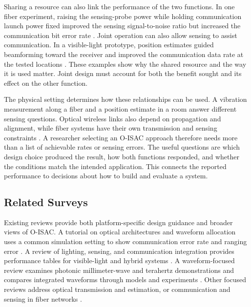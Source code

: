 Sharing a resource can also link the performance of the two functions.
In one fiber experiment, raising the sensing-probe power while holding
communication launch power fixed improved the sensing signal-to-noise ratio
but increased the communication bit error rate \cite{OISAC_SCR00057}.
Joint operation can also allow sensing to assist communication. In a
visible-light prototype, position estimates guided beamforming toward the
receiver and improved the communication data rate at the tested locations
\cite{OISAC_SCR00196}. These examples show why the shared resource and the way
it is used matter. Joint design must account for both the benefit sought and
its effect on the other function.

The physical setting determines how these relationships can be used.
A vibration measurement along a fiber and a position estimate in a room
answer different sensing questions. Optical wireless links also depend on
propagation and alignment, while fiber systems have their own transmission
and sensing constraints \cite{OISAC_SCR00916,OISAC_SCR01085,Mohsan2026OISACReview}.
A researcher selecting an O-ISAC approach therefore needs more than a list
of achievable rates or sensing errors. The useful questions are which design
choice produced the result, how both functions responded, and whether the
conditions match the intended application. This connects the reported
performance to decisions about how to build and evaluate a system.

\subsection{Related Surveys}
\label{sec:related_surveys}

Existing reviews provide both platform-specific design guidance and broader
views of O-ISAC. A tutorial on optical architectures and waveform allocation
uses a common simulation setting to show communication error rate and ranging
error \cite{Wen2024OISACArchitectures}. A review of lighting, sensing, and
communication integration provides performance tables for visible-light and
hybrid systems \cite{Liang2024LiSACReview}. A waveform-focused review examines
photonic millimeter-wave and terahertz demonstrations and compares integrated
waveforms through models and experiments
\cite{Lyu2026PhotonicTHzWaveforms}. Other focused reviews address optical transmission and
estimation, or communication and sensing in fiber networks
\cite{Su2025OISACTheoryPractice,Khorasgani2026GeneralOpticalISACSurvey,
Liu2026OpticalFiberISACReview,Lu2026ConvergedFiberISACReview}.

